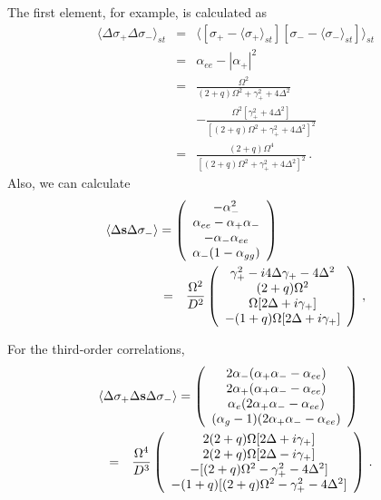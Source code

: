 \documentclass[twocolumn,aps,eqsecnum,showkeys,amsmath]{revtex4-2}
\begin{document}
 The first element, for example, is calculated as 
%
\begin{eqnarray*} 
\langle \Delta \sigma_+ \Delta \sigma_- \rangle_{st} 
	&=& \langle [\sigma_+  - \langle \sigma_+  \rangle_{st}] 
	[\sigma_-  - \langle \sigma_-  \rangle_{st}] \rangle_{st} 	\\ 
	&=& \alpha_{ee} -|\alpha_+|^2 	\\  
&=& \frac{ \Omega^2 }{(2+q)\Omega^2 +\gamma_+^2 +4\Delta^2 }     \\ 
    && -\frac{ \Omega^2[\gamma_+^2 +4\Delta^2] }
    { [(2+q)\Omega^2 +\gamma_+^2 +4\Delta^2 ]^2}  \\ 
&=& \frac{ (2+q)\Omega^4}
    { [(2+q)\Omega^2 +\gamma_+^2 +4\Delta^2 ]^2} \,. 
\end{eqnarray*}
Also, we can calculate 
%
\begin{eqnarray} 	 \label{eq:corre2stb} 
\lefteqn{  \langle \Delta \mathbf{s}  \Delta \sigma_- \rangle = 
\left( \begin{array}{c}  -\alpha_-^2 \\    \alpha_{ee} -\alpha_+ \alpha_- \\   
-\alpha_- \alpha_{ee} \\ \alpha_- (1- \alpha_{gg}) \end{array} 	\right) } 
	\hspace{15mm} 	\\ 
&=& \frac{\Omega^2}{D^2} \left( \begin{array}{c} 
\gamma_+^2 -i4\Delta \gamma_+ -4\Delta^2 	\\ 
(2+q) \Omega^2 	\\  	\Omega [2\Delta +i \gamma_+] 	\\
-(1+q) \Omega [2\Delta +i \gamma_+] 	\end{array} \right) \,,		\nonumber	
\end{eqnarray} 

For the third-order correlations,
%
\begin{eqnarray} 	\label{eq:corre3st}
\lefteqn{   \langle \Delta \sigma_+ \Delta \mathbf{s} 
\Delta \sigma_- \rangle = \left( \begin{array}{c} 
2\alpha_- (\alpha_+ \alpha_- -\alpha_{ee}) \\  
2\alpha_+ (\alpha_+ \alpha_- -\alpha_{ee}) \\ 
\alpha_e (2\alpha_+ \alpha_- -\alpha_{ee}) \\
(\alpha_g -1) (2\alpha_+ \alpha_- -\alpha_{ee}) \end{array}  \right) } 
	\hspace{2mm}  \\ 
&=&\frac{\Omega^4}{D^3} \left( \begin{array}{c} 
2(2+q) \Omega [2\Delta +i \gamma_+] 	\\
2(2+q) \Omega [2\Delta -i \gamma_+] 	\\ 
-[(2+q) \Omega^2 -\gamma_+^2 -4\Delta^2] 	\\
-(1+q) [(2+q) \Omega^2 -\gamma_+^2 -4\Delta^2]
	\end{array} \right) 		\,.  \nonumber 
\end{eqnarray} 
\end{document}
